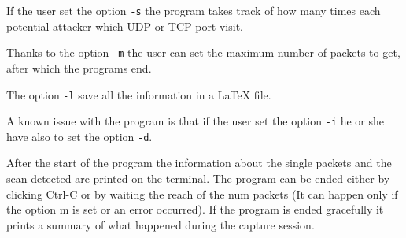 If the user set the option \lstinline|-s| the program takes track of how many times
each potential attacker which UDP or TCP port visit.

Thanks to the option \lstinline|-m| the user can set the maximum number of packets to get, after which the programs end.

The option \lstinline|-l| save all the information in a \LaTeX{} file.

A known issue with the program is that if the user set the option \lstinline|-i| he or she have also to set the option \lstinline|-d|.

After the start of the program the information about the single packets and the scan detected are printed on the terminal. The program can be ended either by clicking Ctrl-C or by waiting the reach of the num packets (It can happen only if the option m is set or an error occurred). If the program is ended gracefully it prints a summary of what happened
during the capture session.









